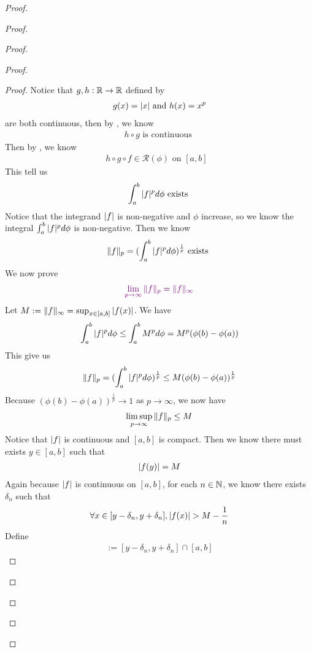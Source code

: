 \documentclass{report}
\begin{document}
\begin{proof}
\begin{proof}
\begin{proof}
\begin{proof}
\begin{proof}
Notice that $g,h:\mathbb{R}\rightarrow \mathbb{R}$ defined by 
\begin{align*}
g(x)=|x|\text{ and }h(x)=x^p
\end{align*}
are both continuous, then by , we know 
\begin{align*}
h\circ g\text{ is continuous }
\end{align*}
Then by , we know 
\begin{align*}
h \circ  g \circ  f \in \mathscr{R}(\phi)\text{ on $[a,b]$ }
\end{align*}
This tell us 
\begin{align*}
\int_a^b |f|^p d\phi \text{ exists }
\end{align*}
Notice that the integrand $|f|$ is non-negative and $\phi$ increase, so we know the integral $\int_a^b |f|^p d\phi$ is non-negative. Then we know 
\begin{align*}
\| f \|_p=(\int_a^b |f|^pd\phi)^{\frac{1}{p}}\text{ exists }
\end{align*}
We now prove 
\begin{align*}
\textcolor{violet}{\lim_{p\to \infty}\| f \|_p=\| f \|_\infty}
\end{align*}
Let $M:=\| f \|_\infty=\sup_{x\in [a,b]}|f(x)|$. We have 
\begin{align*}
  \int_a^b |f|^p d\phi \leq \int_a^b M^p d \phi =M^p (\phi(b)-\phi(a))
\end{align*}
This give us 
\begin{align*}
\| f \|_p=(\int_a^b |f|^p d\phi)^{\frac{1}{p}}\leq M (\phi(b)-\phi(a))^{\frac{1}{p}}
\end{align*}
Because $(\phi(b)-\phi(a))^{\frac{1}{p}}\to 1$ as $p\to \infty$, we now have 
\begin{align*}
\limsup_{p\to\infty} \| f \|_p \leq M
\end{align*}
Notice that $|f|$ is  continuous and $[a,b]$ is compact. Then we know there must exists $y\in [a,b]$ such that 
\begin{align*}
|f(y)|=M
\end{align*}
Again because $|f|$ is continuous on $[a,b]$, for each $n\in\mathbb{N}$, we know there exists $\delta_n$ such that 
\begin{align*}
  \forall x\in [y-\delta_n,y+\delta_n], \abso{f(x)}>M-\frac{1}{n}
\end{align*}
Define 
\begin{align*}
[c,d]:=[y-\delta_n,y+\delta_n]\cap [a,b]
\end{align*}

\end{proof}
\end{proof}
\end{proof}
\end{proof}
\end{proof}
\end{document}
